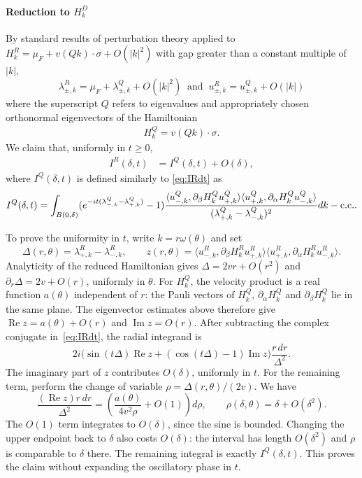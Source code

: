 \documentclass[a4paper,11pt]{article}
\theoremstyle{plain}
\theoremstyle{remark}
\begin{document}
\paragraph{Reduction to $H_k^{D}$}
By standard results of perturbation theory \cite[Chapter XII]{ReedSimon4} applied to
$H_k^{R} = \mu_{F} + v (Q k) \cdot \sigma + O(|k|^{2})
$ with gap greater than a constant multiple of $|k|$,
\[
  \lambda^{R}_{\pm,k} = \mu_F+\lambda^{Q}_{\pm,k} +
  O(|k|^{2})\;\;\mbox{and}\;\;   u^{R}_{\pm,k} = u^{Q}_{\pm,k} + O(|k|)
\]
where the superscript $Q$ refers to eigenvalues and appropriately
chosen orthonormal eigenvectors of the Hamiltonian
\begin{align*}
  H_k^{Q} = v(Qk) \cdot \sigma.
\end{align*}
We claim that, uniformly in $t\ge0$,
\begin{align*}
  I^{R} (\delta,t) &= I^{Q}(\delta,t) + O(\delta),
\end{align*}
where $I^{Q}(\delta,t)$ is defined similarly to
\eqref{eq:IRdt} as
\begin{align*}
  I^{Q}(\delta,t) = \int_{B(0,\delta)}  (e^{-i t (\lambda^{Q}_{-,k} - \lambda^{Q}_{+,k})} - 1)\frac{\langle u^{Q}_{-,k}, \partial_\beta H_k^{Q} u^{Q}_{+,k} \rangle\langle u^{Q}_{+,k},\partial_\alpha H_k^{Q}u^{Q}_{-,k}\rangle}{(\lambda^{Q}_{+,k} - \lambda^{Q}_{-,k})^{2}}dk - {\rm c.c.}.
\end{align*}


To prove the uniformity in $t$, write $k=r\omega(\theta)$ and set
\[
\Delta(r,\theta)=\lambda^R_{+,k}-\lambda^R_{-,k},\qquad
z(r,\theta)=\langle u^R_{-,k},\partial_\beta H_k^Ru^R_{+,k}\rangle
\langle u^R_{+,k},\partial_\alpha H_k^Ru^R_{-,k}\rangle.
\]
Analyticity of the reduced Hamiltonian gives
$\Delta=2vr+O(r^2)$ and $\partial_r\Delta=2v+O(r)$,
uniformly in $\theta$. For $H_k^Q$, the velocity product is a real
function $a(\theta)$ independent of $r$: the Pauli vectors of
$H_k^Q$, $\partial_\alpha H_k^Q$ and $\partial_\beta H_k^Q$ lie in the
same plane. The eigenvector estimates above therefore give
$\operatorname{Re}z=a(\theta)+O(r)$ and
$\operatorname{Im}z=O(r)$.
After subtracting the complex conjugate in~\eqref{eq:IRdt}, the radial
integrand is
\[
2i\bigl(\sin(t\Delta)\operatorname{Re}z
+(\cos(t\Delta)-1)\operatorname{Im}z\bigr)\frac{r\,dr}{\Delta^2}.
\]
The imaginary part of $z$ contributes $O(\delta)$, uniformly in $t$.
For the remaining term, perform the change of variable
$\rho=\Delta(r,\theta)/(2v)$. We have
\[
\frac{(\operatorname{Re}z)r\,dr}{\Delta^2}
=\left(\frac{a(\theta)}{4v^2\rho}+O(1)\right)d\rho,
\qquad \rho(\delta,\theta)=\delta+O(\delta^2).
\]
The $O(1)$ term integrates to $O(\delta)$, since the sine is bounded.
Changing the upper endpoint back to $\delta$ also costs $O(\delta)$:
the interval has length $O(\delta^2)$ and $\rho$ is comparable to
$\delta$ there. The remaining integral is exactly $I^Q(\delta,t)$.
This proves the claim without expanding the oscillatory phase in $t$.
\end{document}

